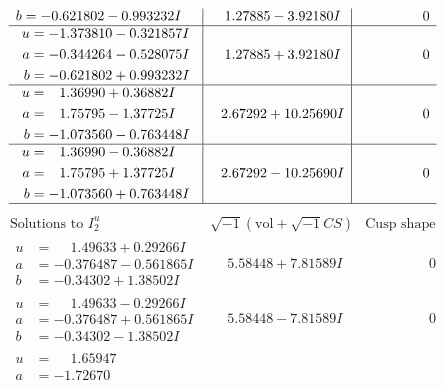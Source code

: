 \documentclass[1p]{elsarticle_modified}
\theoremstyle{definition}
\newcommand{\I}{\sqrt{-1}}
\begin{document}
$$\begin{array}{c|c|c}
\begin{aligned}
b &= -0.621802 - 0.993232 I\end{aligned}
 & \phantom{-}1.27885 - 3.92180 I & \phantom{-0.000000 } 0 \\ \hline\begin{aligned}
u &= -1.373810 - 0.321857 I \\
a &= -0.344264 - 0.528075 I \\
b &= -0.621802 + 0.993232 I\end{aligned}
 & \phantom{-}1.27885 + 3.92180 I & \phantom{-0.000000 } 0 \\ \hline\begin{aligned}
u &= \phantom{-}1.36990 + 0.36882 I \\
a &= \phantom{-}1.75795 - 1.37725 I \\
b &= -1.073560 - 0.763448 I\end{aligned}
 & \phantom{-}2.67292 + 10.25690 I & \phantom{-0.000000 } 0 \\ \hline\begin{aligned}
u &= \phantom{-}1.36990 - 0.36882 I \\
a &= \phantom{-}1.75795 + 1.37725 I \\
b &= -1.073560 + 0.763448 I\end{aligned}
 & \phantom{-}2.67292 - 10.25690 I & \phantom{-0.000000 } 0\\
 \hline 
 \end{array}$$\newpage$$\begin{array}{c|c|c}  
\text{Solutions to }I^u_{2}& \I (\text{vol} + \sqrt{-1}CS) & \text{Cusp shape}\\
 \hline 
\begin{aligned}
u &= \phantom{-}1.49633 + 0.29266 I \\
a &= -0.376487 - 0.561865 I \\
b &= -0.34302 + 1.38502 I\end{aligned}
 & \phantom{-}5.58448 + 7.81589 I & \phantom{-0.000000 } 0 \\ \hline\begin{aligned}
u &= \phantom{-}1.49633 - 0.29266 I \\
a &= -0.376487 + 0.561865 I \\
b &= -0.34302 - 1.38502 I\end{aligned}
 & \phantom{-}5.58448 - 7.81589 I & \phantom{-0.000000 } 0 \\ \hline\begin{aligned}
u &= \phantom{-}1.65947\phantom{ +0.000000I} \\
a &= -1.72670\phantom{ +0.000000I} \\

\end{aligned}
\end{array}$$
\end{document}
